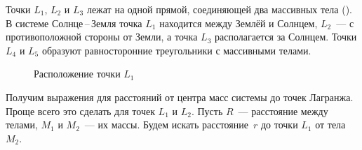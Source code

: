 Точки $L_1$, $L_2$ и $L_3$ лежат на одной прямой, соединяющей два массивных тела (). В системе Солнце\,--\,Земля точка $L_1$ находится между Землёй и Солнцем, $L_2$~--- с противоположной стороны от Земли, а точка $L_3$ располагается за Солнцем. Точки $L_4$ и $L_5$ образуют равносторонние треугольники с массивными телами.

%

\begin{wrapfigure}[4]{r}{0.45\tw}
    \centering
    \vspace{-.5pc}
    \caption{Расположение точки $L_1$}
    \label{pic:larg-points-1-2}
\end{wrapfigure}
Получим выражения для расстояний от центра масс системы до точек Лагранжа. Проще всего это сделать для точек $L_1$ и $L_2$. Пусть $R$~--- расстояние между телами, $M_1$ и $M_2$~--- их массы. Будем искать расстояние~$r$ до точки $L_1$ от тела $M_2$.

